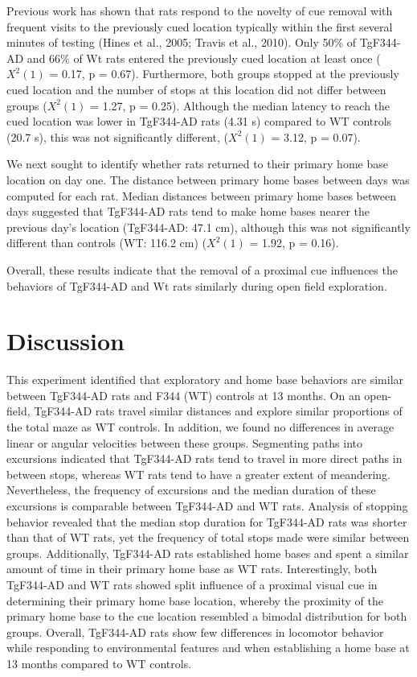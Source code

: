 \documentclass[fleqn,10pt]{wlscirep}
\begin{document}
Previous work has shown that rats respond to the novelty of cue removal with frequent visits to the previously cued location typically within the first several minutes of testing \cite{hines_home_2005}(Hines et al., 2005; Travis et al., 2010). Only 50\% of TgF344-AD and 66\% of Wt rats entered the previously cued location at least once ($X^2(1)$ = 0.17, p = 0.67). Furthermore, both groups stopped at the previously cued location and the number of stops at this location did not differ between groups ($X^2(1)$ = 1.27, p = 0.25). Although the median latency to reach the cued location was lower in TgF344-AD rats (4.31 s) compared to WT controls (20.7 s), this was not significantly different, ($X^2(1)$ = 3.12, p = 0.07). 

We next sought to identify whether rats returned to their primary home base location on day one. The distance between primary home bases between days was computed for each rat. Median distances between primary home bases between days suggested that TgF344-AD rats tend to make home bases nearer the previous day’s location (TgF344-AD: 47.1 cm), although this was not significantly different than controls (WT: 116.2 cm) ($X^2(1)$ = 1.92, p = 0.16). 

Overall, these results indicate that the removal of a proximal cue influences the behaviors of TgF344-AD and Wt rats similarly during open field exploration. 

\section*{Discussion}

This experiment identified that exploratory and home base behaviors are similar between TgF344-AD rats and F344 (WT) controls at 13 months. On an open-field, TgF344-AD rats travel similar distances and explore similar proportions of the total maze as WT controls. In addition, we found no differences in average linear or angular velocities between these groups. Segmenting paths into excursions indicated that TgF344-AD rats tend to travel in more direct paths in between stops, whereas WT rats tend to have a greater extent of meandering. Nevertheless, the frequency of excursions and the median duration of these excursions is comparable between TgF344-AD and WT rats. Analysis of stopping behavior revealed that the median stop duration for TgF344-AD rats was shorter than that of WT rats, yet the frequency of total stops made were similar between groups. Additionally, TgF344-AD rats established home bases and spent a similar amount of time in their primary home base as WT rats. Interestingly, both TgF344-AD and WT rats showed split influence of a proximal visual cue in determining their primary home base location, whereby the proximity of the primary home base to the cue location resembled a bimodal distribution for both groups. Overall, TgF344-AD rats show few differences in locomotor behavior while responding to environmental features and when establishing a home base at 13 months compared to WT controls. 
\end{document}
